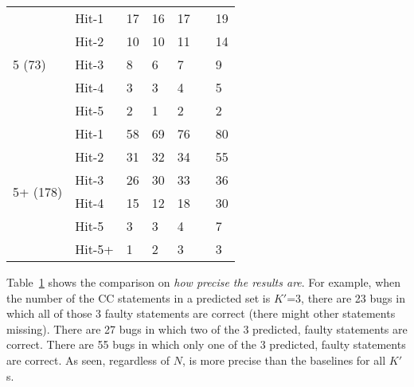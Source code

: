 \begin{table}[t]
{\begin{center}
\begin{tabular}{p{1.3cm}<{\centering}|p{0.8cm}<{\centering}|p{1cm}<{\centering}|p{0.8cm}<{\centering}|p{1.3cm}<{\centering}|p{1cm}<{\centering}|p{1.3cm}<{\centering}}
				\hline 
				\multirow{5}{*}{5 (73)}  & Hit-1    & 17 & 16 & 17 & & 19 \\
				& Hit-2       						  & 10 & 10 & 11 & &14 \\
				& Hit-3       						  & 8 & 6 & 7 & &9 \\
				& Hit-4         					  & 3 & 3 & 4 & &5 \\
				& Hit-5      						   & 2 & 1 & 2 & &2 \\
				\hline
				\multirow{6}{*}{5+ (178)}  & Hit-1 & 58 & 69 & 76 & & 80 \\
				& Hit-2        				       & 31 & 32 & 34 & &55 \\
				& Hit-3       				       & 26 & 30 & 33 & &36 \\
				& Hit-4      				       & 15 & 12 & 18 & &30 \\
				& Hit-5      				       & 3  & 3 & 4 & &7 \\
				& Hit-5+       				       & 1  & 2 & 3 & & 3 \\
				\hline
			\end{tabular}
			\label{fig:rq1-prec}
		\end{center}
	}
\end{table}

Table~\ref{fig:rq1-prec} shows the comparison on {\em how precise the
results are}. For example, when the number of the CC statements in a
predicted set is $K'$=3, there are 23 bugs in which all of those 3
faulty statements are correct (there might other statements missing).
There are 27 bugs in which two of the 3 predicted, faulty statements
are correct. There are 55 bugs in which only one of the 3 predicted,
faulty statements are correct. As seen, regardless of $N$, {\tool}
is more precise than the baselines for all $K'$s.










